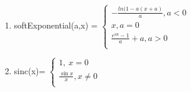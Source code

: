 \documentclass[]{article}
\makeatletter
\newcommand{\xslalph}[1]{\expandafter\@xslalph\csname c@#1\endcsname}
\newcommand{\@xslalph}[1]{%
    \ifcase#1\or а\or б\or в\or г\or д\or e\or є\or ж\or з\or i%
    \or й\or к\or л\or м\or н\or о\or п\or р\or с\or т%
    \or у\or ф\or х\or ц\or ч\or ш\or ю\or я\or аа\or бб\or вв %
    \else\@ctrerr\fi%
}
\makeatother
\begin{document}
\begin{enumerate}
\begin{enumerate}[label=\xslalph*)]
\item 
softExponential(a,x) = \(\left\{ \begin{matrix}
 - \frac{ln(1 - a(x + a)}{a},a < 0 \\
x,a = 0 \\
\frac{e^{\text{ax}} - 1}{a} + a,a > 0 \\
\end{matrix} \right.\ \)

\item 
sinc(x)= \(\left\{ \begin{matrix}
1,\ x = 0 \\
\frac{\sin x}{x},x \neq 0 \\
\end{matrix} \right.\ \)

 \end{enumerate}
\end{enumerate}
\end{document}
